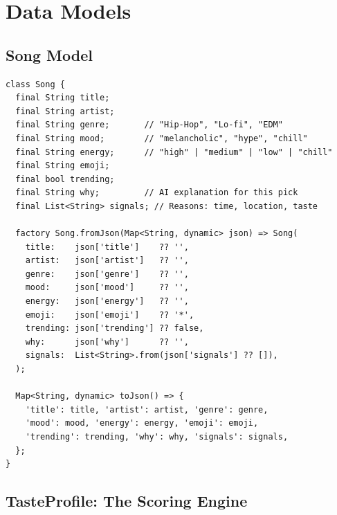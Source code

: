 \documentclass[12pt, a4paper]{report}
\begin{document}
\chapter{Data Models}

\section{Song Model}

\begin{tcolorbox}[cyanbox, title=lib/models/models.dart]
\begin{lstlisting}[style=dartcode]
class Song {
  final String title;
  final String artist;
  final String genre;       // "Hip-Hop", "Lo-fi", "EDM"
  final String mood;        // "melancholic", "hype", "chill"
  final String energy;      // "high" | "medium" | "low" | "chill"
  final String emoji;
  final bool trending;
  final String why;         // AI explanation for this pick
  final List<String> signals; // Reasons: time, location, taste

  factory Song.fromJson(Map<String, dynamic> json) => Song(
    title:    json['title']    ?? '',
    artist:   json['artist']   ?? '',
    genre:    json['genre']    ?? '',
    mood:     json['mood']     ?? '',
    energy:   json['energy']   ?? '',
    emoji:    json['emoji']    ?? '*',
    trending: json['trending'] ?? false,
    why:      json['why']      ?? '',
    signals:  List<String>.from(json['signals'] ?? []),
  );

  Map<String, dynamic> toJson() => {
    'title': title, 'artist': artist, 'genre': genre,
    'mood': mood, 'energy': energy, 'emoji': emoji,
    'trending': trending, 'why': why, 'signals': signals,
  };
}
\end{lstlisting}
\end{tcolorbox}

\section{TasteProfile: The Scoring Engine}
\end{document}
